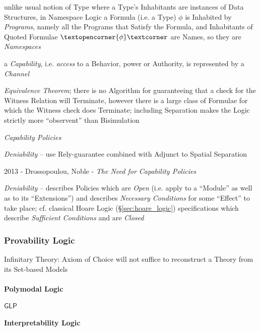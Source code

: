 unlike usual notion of Type where a Type's Inhabitants are instances of Data
Structures, in Namespace Logic a Formula (i.e. a Type) $\phi$ is Inhabited by
\emph{Programs}, namely all the Programs that Satisfy the Formula, and
Inhabitants of Quoted Formulae $\textopencorner{\phi}\textcorner$ are Names, so
they are \emph{Namespaces}

a \emph{Capability}, i.e. \emph{access} to a Behavior, power or Authority, is
represented by a \emph{Channel}

\emph{Equivalence Theorem}; there is no Algorithm for guaranteeing that a check
for the Witness Relation will Terminate, however there is a large class of
Formulae for which the Witness check does Terminate; including Separation makes
the Logic strictly more ``observent'' than Bisimulation

\emph{Capability Policies}

\emph{Deniability} -- use Rely-guarantee combined with Adjunct to Spatial
Separation

2013 - Drossopoulou, Noble - \emph{The Need for Capability Policies}

\emph{Deniability} -- describes Policies which are \emph{Open} (i.e. apply to a
``Module'' as well as to its ``Extensions'') and describes \emph{Necessary
  Conditions} for some ``Effect'' to take place; cf. classical Hoare Logic
(\S\ref{sec:hoare_logic}) specifications which describe \emph{Sufficient
  Conditions} and are \emph{Closed}



\subsubsection{Provability Logic}\label{sec:provability_logic}

Infinitary Theory: Axiom of Choice will not suffice to reconstruct a
Theory from its Set-based Models



\paragraph{Polymodal Logic}\label{sec:polymodal_logic}\hfill

$\mathsf{GLP}$



\paragraph{Interpretability Logic}\label{sec:interpretability_logic}\hfill

